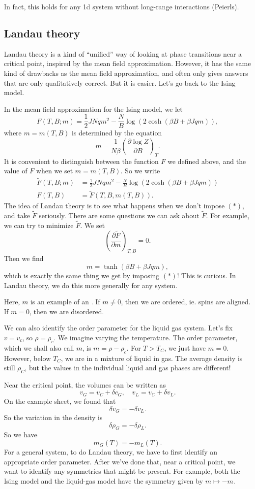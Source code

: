 \documentclass[a4paper]{article}
\begin{document}
In fact, this holds for any 1d system without long-range interactions (Peierls).

\subsection{Landau theory}
Landau theory is a kind of ``unified'' way of looking at phase transitions near a critical point, inspired by the mean field approximation. However, it has the same kind of drawbacks as the mean field approximation, and often only gives answers that are only qualitatively correct. But it is easier. Let's go back to the Ising model.

In the mean field approximation for the Ising model, we let
\[
  F (T, B; m) = \frac{1}{2} JNqm^2 - \frac{N}{B} \log \left(2 \cosh (\beta B + \beta Jqm)\right),
\]
where $m = m(T, B)$ is determined by the equation
\[
  m = \frac{1}{N\beta} \left(\frac{\partial \log Z}{\partial B}\right)_T.\tag{$*$}
\]
It is convenient to distinguish between the function $F$ we defined above, and the value of $F$ when we set $m = m(T, B)$. So we write
\begin{align*}
  \tilde{F} (T, B; m) &= \frac{1}{2} JNqm^2 - \frac{N}{B} \log \left(2 \cosh (\beta B + \beta Jqm)\right)\\
  F(T, B) &= \tilde{F}(T, B, m(T, B)).
\end{align*}
The idea of Landau theory is to see what happens when we don't impose $(*)$, and take $\tilde{F}$ seriously. There are some questions we can ask about $\tilde{F}$. For example, we can try to minimize $\tilde{F}$. We set
\[
  \left(\frac{\partial \tilde{F}}{\partial m}\right)_{T, B} = 0.
\]
Then we find
\[
  m = \tanh (\beta B + \beta Jqm),
\]
which is exactly the same thing we get by imposing $(*)$! This is curious. In Landau theory, we do this more generally for any system.

Here, $m$ is an example of an . If $m \not= 0$, then we are ordered, ie. spins are aligned. If $m = 0$, then we are disordered.

We can also identify the order parameter for the liquid gas system. Let's fix $v = v_c$, so $\rho = \rho_c$. We imagine varying the temperature. The order parameter, which we shall also call $m$, is $m = \rho - \rho_c$. For $T > T_C$, we just have $m = 0$. However, below $T_C$, we are in a mixture of liquid in gas. The average density is still $\rho_C$, but the values in the individual liquid and gas phases are different!

Near the critical point, the volumes can be written as
\[
  v_G = v_C + \delta c_G,\quad v_L = v_C + \delta v_L.
\]
On the example sheet, we found that
\[
  \delta v_G = - \delta v_L.
\]
So the variation in the density is
\[
  \delta \rho_G = - \delta \rho_L.
\]
So we have
\[
  m_G(T) = - m_L(T).
\]
For a general system, to do Landau theory, we have to first identify an appropriate order parameter. After we've done that, near a critical point, we want to identify any symmetries that might be present. For example, both the Ising model and the liquid-gas model have the symmetry given by $m \mapsto -m$.
\end{document}
